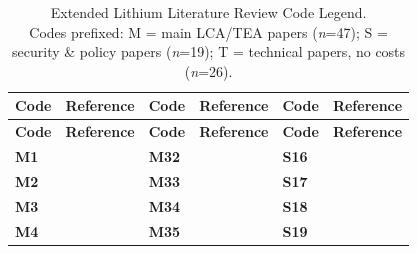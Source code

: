\clearpage

\captionsetup[longtable]{singlelinecheck=false}
{
\singlespacing
\setlength{\LTpre}{0pt}
\setlength{\LTpost}{4pt}

\small
\setlength{\tabcolsep}{4pt}
\begin{longtable}{p{0.9cm}>{\raggedright\arraybackslash}p{4cm}@{\hskip 0.5cm}p{0.9cm}>{\raggedright\arraybackslash}p{4cm}@{\hskip 0.5cm}p{0.9cm}>{\raggedright\arraybackslash}p{4cm}}
\caption[Extended Lithium Literature Review Code Legend.]{Extended Lithium Literature Review Code Legend. \\ Codes prefixed: \textsf{M} = main LCA/TEA papers (\emph{n}=47);
\textsf{S} = security \& policy papers (\emph{n}=19);
\textsf{T} = technical papers, no costs (\emph{n}=26).}
\label{tab:c2-litreview-legend}\\
\toprule
\textbf{Code} & \textbf{Reference} &
\textbf{Code} & \textbf{Reference} &
\textbf{Code} & \textbf{Reference} \\
\midrule
\endfirsthead
\toprule
\textbf{Code} & \textbf{Reference} &
\textbf{Code} & \textbf{Reference} &
\textbf{Code} & \textbf{Reference} \\
\midrule
\endhead
\bottomrule
\endfoot
\textcolor{codelabel}{\textsf{\textbf{M1}}} & \citet{agusdinataSocioenvironmentalImpactsLithium2018} & \textcolor{codelabel}{\textsf{\textbf{M32}}} & \citet{schenkerLithiumGeothermalBrines2024} & \textcolor{codelabel}{\textsf{\textbf{S16}}} & \citet{renMultiplexCharacteristicsVulnerability2024} \\
\textcolor{codelabel}{\textsf{\textbf{M2}}} & \citet{alessiaChallengesSustainableLithium2021} & \textcolor{codelabel}{\textsf{\textbf{M33}}} & \citet{schenkerCurrentFutureImpacts2025} & \textcolor{codelabel}{\textsf{\textbf{S17}}} & \citet{sunGlobalCompetitionLithiumIon2021} \\
\textcolor{codelabel}{\textsf{\textbf{M3}}} & \citet{ambroseUnderstandingFutureLithium2020a} & \textcolor{codelabel}{\textsf{\textbf{M34}}} & \citet{schombergExtendedLifeCycle2021} & \textcolor{codelabel}{\textsf{\textbf{S18}}} & \citet{tanMappingCobaltLithium2024} \\
\textcolor{codelabel}{\textsf{\textbf{M4}}} & \citet{buschEffectsDemandRecycling2025} & \textcolor{codelabel}{\textsf{\textbf{M35}}} & \citet{setuEnvironmentalImpactAssessment2026} & \textcolor{codelabel}{\textsf{\textbf{S19}}} & \citet{vivodaLithiumNexusEnergy2024} \\

\end{longtable}}
